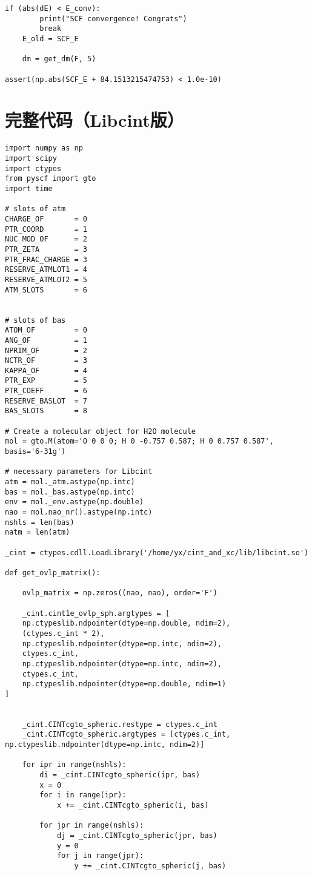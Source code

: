 \documentclass[12pt, a4paper, oneside]{ctexart}
\begin{document}
\begin{appendices}
\begin{lstlisting}[style = Python]
    if (abs(dE) < E_conv):
        print("SCF convergence! Congrats")
        break
    E_old = SCF_E

    dm = get_dm(F, 5)

assert(np.abs(SCF_E + 84.1513215474753) < 1.0e-10)
\end{lstlisting}
\newpage
\section{完整代码（Libcint版）}
\begin{lstlisting}[style = Python]
import numpy as np
import scipy
import ctypes
from pyscf import gto
import time

# slots of atm
CHARGE_OF       = 0
PTR_COORD       = 1
NUC_MOD_OF      = 2
PTR_ZETA        = 3
PTR_FRAC_CHARGE = 3
RESERVE_ATMLOT1 = 4
RESERVE_ATMLOT2 = 5
ATM_SLOTS       = 6


# slots of bas
ATOM_OF         = 0
ANG_OF          = 1
NPRIM_OF        = 2
NCTR_OF         = 3
KAPPA_OF        = 4
PTR_EXP         = 5
PTR_COEFF       = 6
RESERVE_BASLOT  = 7
BAS_SLOTS       = 8

# Create a molecular object for H2O molecule
mol = gto.M(atom='O 0 0 0; H 0 -0.757 0.587; H 0 0.757 0.587', basis='6-31g')

# necessary parameters for Libcint
atm = mol._atm.astype(np.intc)
bas = mol._bas.astype(np.intc)
env = mol._env.astype(np.double)
nao = mol.nao_nr().astype(np.intc)
nshls = len(bas)
natm = len(atm)

_cint = ctypes.cdll.LoadLibrary('/home/yx/cint_and_xc/lib/libcint.so')

def get_ovlp_matrix():
    
    ovlp_matrix = np.zeros((nao, nao), order='F')
    
    _cint.cint1e_ovlp_sph.argtypes = [
    np.ctypeslib.ndpointer(dtype=np.double, ndim=2),
    (ctypes.c_int * 2),
    np.ctypeslib.ndpointer(dtype=np.intc, ndim=2),
    ctypes.c_int,
    np.ctypeslib.ndpointer(dtype=np.intc, ndim=2),
    ctypes.c_int,
    np.ctypeslib.ndpointer(dtype=np.double, ndim=1)
]
    

    _cint.CINTcgto_spheric.restype = ctypes.c_int
    _cint.CINTcgto_spheric.argtypes = [ctypes.c_int, np.ctypeslib.ndpointer(dtype=np.intc, ndim=2)]
    
    for ipr in range(nshls):
        di = _cint.CINTcgto_spheric(ipr, bas)
        x = 0
        for i in range(ipr):
            x += _cint.CINTcgto_spheric(i, bas)

        for jpr in range(nshls):
            dj = _cint.CINTcgto_spheric(jpr, bas)
            y = 0
            for j in range(jpr):
                y += _cint.CINTcgto_spheric(j, bas)


\end{lstlisting}
\end{appendices}
\end{document}
